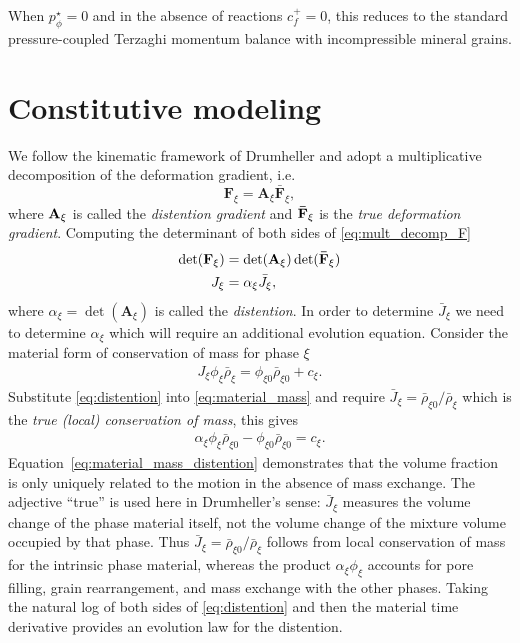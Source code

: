 \documentclass[11pt]{article}
\begin{document}
When $p_\phi^\star=0$ and in the absence of reactions $c^{+}_f =0$, this reduces to the standard pressure-coupled Terzaghi momentum balance \cite{sun2013stabilized} with incompressible mineral grains.

\section{Constitutive modeling}
\label{sec:constitutive}

We follow the kinematic framework of Drumheller \cite{drumheller2000} and adopt a multiplicative decomposition of the deformation gradient, i.e.\
%
\begin{equation}
  \mathbf{F}_\xi = \mathbf{A}_\xi \mathbf{\bar{F}}_\xi,
  \label{eq:mult_decomp_F}
\end{equation}
%
where $\mathbf{A}_\xi$ is called the \emph{distention gradient} and $\mathbf{\bar{F}}_\xi$ is the \emph{true deformation gradient}.  Computing the determinant of both sides of \eqref{eq:mult_decomp_F}
%
\begin{align}
  \det(\mathbf{F}_\xi) &= \det(\mathbf{A}_\xi) \det(\mathbf{\bar{F}}_\xi) \notag \\
  J_\xi &= \alpha_\xi \bar{J}_\xi,
  \label{eq:distention}
\end{align}
%
where $\alpha_\xi = \det(\mathbf{A}_\xi)$ is called the \emph{distention}.  In order to determine $\bar{J}_\xi$ we need to determine $\alpha_\xi$ which will require an additional evolution equation. Consider the material form of conservation of mass for phase $\xi$
%
\begin{align}
  J_\xi \phi_{\xi} \bar\rho_{\xi} = \phi_{\xi 0} \bar\rho_{\xi 0} + c_\xi.
  \label{eq:material_mass}
\end{align}
%
Substitute \eqref{eq:distention} into \eqref{eq:material_mass} and require $\bar{J}_\xi = {\bar{\rho}_{\xi 0}} / {\bar\rho_\xi}$ which is the \emph{true (local) conservation of mass}, this gives
%
\begin{align}
  \alpha_\xi \phi_{\xi}\bar\rho_{\xi 0}  - \phi_{\xi 0}\bar\rho_{\xi 0} =    c_\xi. \label{eq:material_mass_distention}
\end{align}
%
Equation~\eqref{eq:material_mass_distention} demonstrates that the volume fraction is only uniquely related to the motion in the absence of mass exchange.  The adjective ``true'' is used here in Drumheller's sense: $\bar{J}_\xi$ measures the volume change of the phase material itself, not the volume change of the mixture volume occupied by that phase.  Thus $\bar{J}_\xi=\bar\rho_{\xi0}/\bar\rho_\xi$ follows from local conservation of mass for the intrinsic phase material, whereas the product $\alpha_\xi\phi_\xi$ accounts for pore filling, grain rearrangement, and mass exchange with the other phases. Taking the natural log of both sides of \eqref{eq:distention} and then the material time derivative provides an evolution law for the distention.
\end{document}
